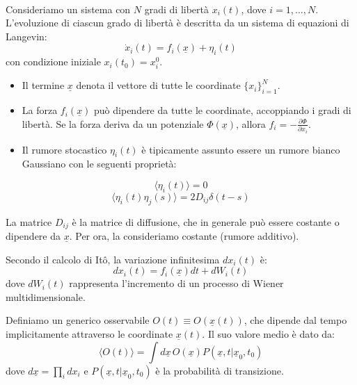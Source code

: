 \hfil \\
Consideriamo un sistema con $N$ gradi di libertà $x_i(t)$, dove $i=1, \dots, N$. L'evoluzione di ciascun grado di libertà è descritta da un sistema di equazioni di Langevin:
\begin{equation}
\dot{x}_i(t) = f_i(\underline{x}) + \eta_i(t)
\label{eq:langevin_multi}
\end{equation}
con condizione iniziale $x_i(t_0) = x_i^0$.

\begin{itemize}
    \item Il termine $\underline{x}$ denota il vettore di tutte le coordinate $\{x_i\}_{i=1}^N$.
    \item La forza $f_i(\underline{x})$ può dipendere da tutte le coordinate, accoppiando i gradi di libertà. Se la forza deriva da un potenziale $\Phi(\underline{x})$, allora $f_i = -\frac{\partial \Phi}{\partial x_i}$.
    \item Il rumore stocastico $\eta_i(t)$ è tipicamente assunto essere un rumore bianco Gaussiano con le seguenti proprietà:
\end{itemize}

\begin{equation} 
\langle \eta_i(t) \rangle = 0 
\end{equation}
\begin{equation}
\langle \eta_i(t)\eta_j(s) \rangle = 2D_{ij}\delta(t-s)
\end{equation}

La matrice $D_{ij}$ è la matrice di diffusione, che in generale può essere costante o dipendere da $\underline{x}$. Per ora, la consideriamo costante (rumore additivo).

Secondo il calcolo di Itô, la variazione infinitesima $dx_i(t)$ è:
\begin{equation}
dx_i(t) = f_i(\underline{x})dt + dW_i(t)
\end{equation}
dove $dW_i(t)$ rappresenta l'incremento di un processo di Wiener multidimensionale.

Definiamo un generico osservabile $O(t) \equiv O(\underline{x}(t))$, che dipende dal tempo implicitamente attraverso le coordinate $\underline{x}(t)$. Il suo valore medio è dato da:
\begin{equation}
\langle O(t) \rangle = \int d\underline{x} \, O(\underline{x}) P(\underline{x}, t | \underline{x}_0, t_0)
\end{equation}
dove $d\underline{x} = \prod_i dx_i$ e $P(\underline{x}, t | \underline{x}_0, t_0)$ è la probabilità di transizione.

